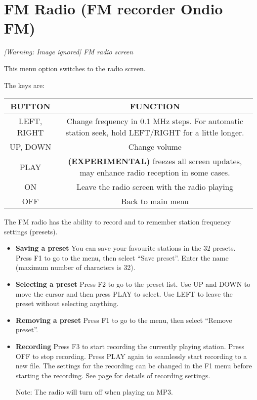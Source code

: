 \section{\label{ref:FMradio}FM Radio (FM recorder Ondio FM)}
{\centering\itshape
  [Warning: Image ignored] %
 \newline
FM radio screen
\par}

This menu option switches to the radio screen. 

The keys are:

\begin{table}[h!]
  \begin{center}
    \begin{tabular}{|c|c|}
      \hline
      BUTTON & FUNCTION \\\hline
      LEFT, RIGHT &Change frequency in 0.1 MHz steps.  For automatic station seek, hold LEFT/RIGHT for a little longer. \\\hline
      UP, DOWN & Change volume \\\hline
      PLAY & \textbf{(EXPERIMENTAL) } freezes all screen updates, may enhance radio reception in some cases. \\\hline
      ON & Leave the radio screen with the radio playing \\\hline
      OFF & Back to main menu \\\hline
    \end{tabular}
  \end{center}
\end{table}
The FM radio has the ability to record and to remember station frequency
settings (presets).

\begin{itemize}

\item \textbf{Saving a preset}
You can save your favourite stations in the 32
presets. Press F1 to go to the menu, then select
``Save preset''. Enter the name (maximum number
of characters is 32).

\item \textbf{Selecting a preset}
Press F2 to go to the preset list. Use UP and DOWN to move the cursor
and then press PLAY to select. Use LEFT to leave the preset without
selecting anything.

\item \textbf{Removing a preset}
Press F1 to go to the menu, then select ``Remove preset''.

\item \textbf{Recording}
Press F3 to start recording the currently playing station. Press OFF to
stop recording. Press PLAY again to seamlessly start recording to a new
file. The settings for the recording can be changed in the F1 menu
before starting the recording. See page \pageref{ref:Recordingsettings}
for details of recording settings.

Note: The radio will turn off when playing an MP3.
\end{itemize}

